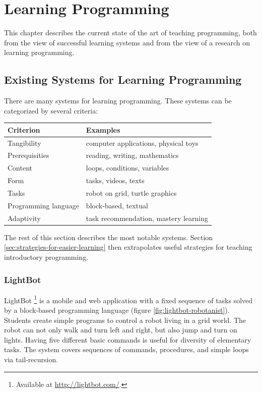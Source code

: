 \chapter{Learning Programming}
\label{chap:learning-programming}

This chapter describes the current state of the art of teaching programming, both from the view of successful learning systems and from the view of a research on learning programming.

\section{Existing Systems for Learning Programming}
\label{sec:existing-systems}

There are many systems for learning programming.
These systems can be categorized by several criteria:

\begin{table}[htb]
\centering
\begin{tabular}{l l}
\toprule
Criterion & Examples \\
\midrule
Tangibility & computer applications, physical toys \\
Prerequisities & reading, writing, mathematics \\
Content & loops, conditions, variables \\
Form & tasks, videos, texts \\ %
Tasks & robot on grid, turtle graphics \\
Programming language & block-based, textual \\
Adaptivity & task recommendation, mastery learning \\
\bottomrule
\end{tabular}
\label{tbl:existing-systems-categorization}
\end{table}


The rest of this section describes the most notable systems.
Section \ref{sec:strategies-for-easier-learning} then extrapolates useful
strategies for teaching introductory programming.


\subsection{LightBot}
\label{sec:lightbot}
LightBot%
\footnote{Available at \url{http://lightbot.com/}.}
is a mobile and web application with a fixed sequence of tasks solved by
a block-based programming language
(figure \ref{fig:lightbot-robotanist}).
Students create simple programs to control a robot living in a grid world.
The robot can not only walk and turn left and right, but also jump and turn on lights.
Having five different basic commands is useful for diversity of elementary tasks.
The system covers sequences of commands, procedures, and simple loops via tail-recursion.

